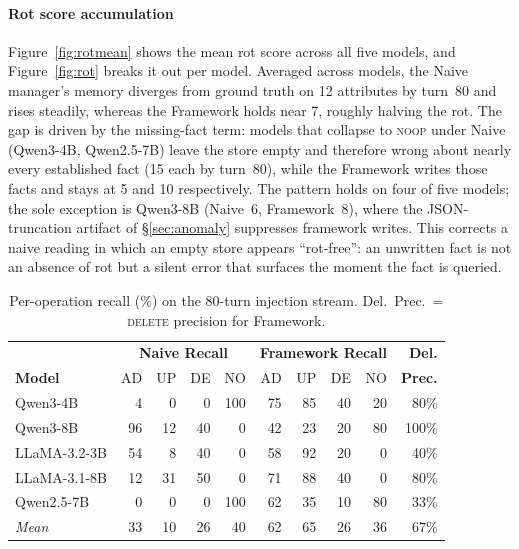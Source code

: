 \documentclass[10pt, twocolumn]{article}
\begin{document}
\paragraph{Rot score accumulation}
Figure~\ref{fig:rotmean} shows the mean rot score across all five models,
and Figure~\ref{fig:rot} breaks it out per model.
Averaged across models, the Naive manager's memory diverges from ground
truth on 12 attributes by turn~80 and rises steadily, whereas the
Framework holds near 7, roughly halving the rot.
The gap is driven by the missing-fact term: models that collapse to
\textsc{noop} under Naive (Qwen3-4B, Qwen2.5-7B) leave the store empty and
therefore wrong about nearly every established fact (15 each by turn~80),
while the Framework writes those facts and stays at 5 and 10 respectively.
The pattern holds on four of five models; the sole exception is Qwen3-8B
(Naive~6, Framework~8), where the JSON-truncation artifact of
\S\ref{sec:anomaly} suppresses framework writes.
This corrects a naive reading in which an empty store appears
``rot-free'': an unwritten fact is not an absence of rot but a silent
error that surfaces the moment the fact is queried.

\begin{table}[t]
\centering
\caption{Per-operation recall (\%) on the 80-turn injection stream.
  Del.\ Prec.\ = \textsc{delete} precision for Framework.}
\label{tab:ops}
\setlength{\tabcolsep}{3pt}
\scriptsize
\begin{tabular}{lrrrr@{\hspace{6pt}}rrrr@{\hspace{6pt}}r}
\toprule
 & \multicolumn{4}{c}{\textbf{Naive Recall}} & \multicolumn{4}{c}{\textbf{Framework Recall}} & \textbf{Del.}\\
\textbf{Model} & AD & UP & DE & NO & AD & UP & DE & NO & \textbf{Prec.} \\
\midrule
Qwen3-4B     & 4  & 0  & 0  & 100 & 75  & 85 & 40 & 20  & 80\% \\
Qwen3-8B     & 96 & 12 & 40 & 0   & 42  & 23 & 20 & 80  & 100\% \\
LLaMA-3.2-3B & 54 & 8  & 40 & 0   & 58  & 92 & 20 & 0   & 40\% \\
LLaMA-3.1-8B & 12 & 31 & 50 & 0   & 71  & 88 & 40 & 0   & 80\% \\
Qwen2.5-7B   & 0  & 0  & 0  & 100 & 62  & 35 & 10 & 80  & 33\% \\
\midrule
\textit{Mean} & 33 & 10 & 26 & 40  & 62  & 65 & 26 & 36  & 67\% \\
\bottomrule
\end{tabular}
\end{table}
\end{document}
